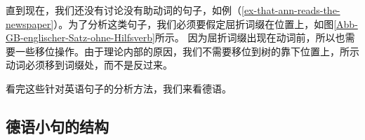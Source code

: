 直到现在，我们还没有讨论没有助动词的句子，如例（\ref{ex-that-ann-reads-the-newspaper}）。为了分析这类句子，我们必须要假定屈折词缀在\inullc 位置上，如图\vref{Abb-GB-englischer-Satz-ohne-Hilfsverb}所示。
因为屈折词缀出现在动词前，所以也需要一些移位操作。由于理论内部的原因，我们不需要移位到树的靠下位置上，所示动词必须移到词缀处，而不是反过来。
%

看完这些针对英语句子的分析方法，我们来看德语。

\subsection{德语小句的结构}
\label{sec-German-clause}

